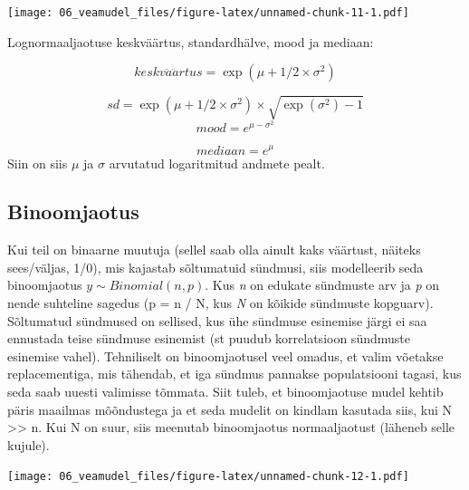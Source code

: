 \documentclass[]{book}
\newenvironment{Shaded}{\begin{snugshade}}{\end{snugshade}}
\newcommand{\CommentTok}[1]{\textcolor[rgb]{0.56,0.35,0.01}{\textit{#1}}}
\newcommand{\DecValTok}[1]{\textcolor[rgb]{0.00,0.00,0.81}{#1}}
\newcommand{\FloatTok}[1]{\textcolor[rgb]{0.00,0.00,0.81}{#1}}
\newcommand{\KeywordTok}[1]{\textcolor[rgb]{0.13,0.29,0.53}{\textbf{#1}}}
\newcommand{\NormalTok}[1]{#1}
\newcommand{\StringTok}[1]{\textcolor[rgb]{0.31,0.60,0.02}{#1}}
\begin{document}
\texttt{[image: 06\_veamudel\_files/figure-latex/unnamed-chunk-11-1.pdf]}

Lognormaaljaotuse keskväärtus, standardhälve, mood ja mediaan:

\[keskv\ddot{a}\ddot{a}rtus = \exp(\mu + 1/2 \times \sigma^2)\]

\[sd = \exp(\mu + 1/2 \times \sigma^2) \times \sqrt{\exp(\sigma^2) - 1}\]
\[mood = e^{\mu - \sigma^2}\]

\[mediaan = e^\mu\]
Siin on siis \(\mu\) ja \(\sigma\) arvutatud logaritmitud andmete pealt.

\hypertarget{binoomjaotus}{%
\subsection{Binoomjaotus}\label{binoomjaotus}}

Kui teil on binaarne muutuja (sellel saab olla ainult kaks väärtust, näiteks sees/väljas, 1/0), mis kajastab sõltumatuid sündmusi, siis modelleerib seda binoomjaotus \(y \sim Binomial(n, p)\).
Kus \emph{n} on edukate sündmuste arv ja \emph{p} on nende suhteline sagedus (p = n / N, kus \emph{N} on kõikide sündmuste kopguarv).
Sõltumatud sündmused on sellised, kus ühe sündmuse esinemise järgi ei saa ennustada teise sündmuse esinemist (st puudub korrelatsioon sündmuste esinemise vahel).
Tehniliselt on binoomjaotusel veel omadus, et valim võetakse replacementiga, mis tähendab, et iga sündmus pannakse populatsiooni tagasi, kus seda saab uuesti valimisse tõmmata.
Siit tuleb, et binoomjaotuse mudel kehtib päris maailmas mõõndustega ja et seda mudelit on kindlam kasutada siis, kui N \textgreater{}\textgreater{} n.
Kui N on suur, siis meenutab binoomjaotus normaaljaotust (läheneb selle kujule).

\begin{Shaded}
\end{Shaded}

\texttt{[image: 06\_veamudel\_files/figure-latex/unnamed-chunk-12-1.pdf]}
\end{document}
